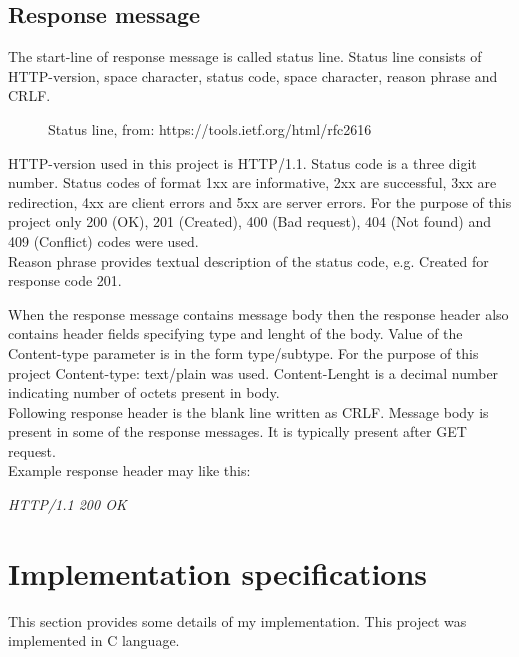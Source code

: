 \documentclass[11pt, a4paper]{article}
\begin{document}
	\subsection{Response message}
	The start-line of response message is called status line. \cite{Fiel:rfc7230} Status line consists of HTTP-version, space character, status code, space character, reason phrase and CRLF. \\
	\begin{figure}[h]
			\centering
			\caption{Status line, from: https://tools.ietf.org/html/rfc2616}
			\label{obrazok1}
	\end{figure}
	\hfill \break	
	HTTP-version used in this project is HTTP/1.1.
	\newpage
	Status code is a three digit number. Status codes of format 1xx are informative, 2xx are successful, 3xx are redirection, 4xx are client errors and 5xx are server
	errors. For the purpose of this project only 200 (OK), 201 (Created), 400 (Bad request), 404 (Not found) and 409 (Conflict) codes were used. \\
	Reason phrase provides textual description of the status code, e.g. Created for response code 201. \hfill \break
	
	When the response message contains message body then the response header also contains header fields specifying type and lenght of the body.
	 \cite{Fiel:rfc2616} Value of the Content-type parameter is in the form type/subtype. For the purpose 		of this project Content-type: text/plain was used. Content-Lenght is a decimal number indicating number of octets present in body. \\
	Following response header is the blank line written as CRLF. Message body is present in some of the response messages. It is typically present after GET request. \\
	Example response header may like this: \\ 
	\begin{center} 
	\textit{HTTP/1.1 200 OK \\ }
	\end{center}
	\section{Implementation specifications}
	This section provides some details of my implementation. This project was implemented in C language.
\end{document}
